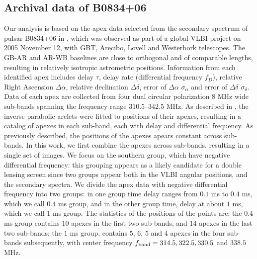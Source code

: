 \documentclass[useAMS,usenatbib]{mn2e}
\begin{document}
\subsection{Archival data of B0834+06}
\label{21}
Our analysis is based on the apex data selected from the secondary
spectrum of pulsar B0834+06 in \citep{2010ApJ...708..232B}, which was
observed as part of a global VLBI project on 2005 November 12, with
GBT, Arecibo, Lovell and Westerbork telescopes.  The GB-AR and AR-WB
baselines are close to orthogonal and of comparable lengths, resulting
in relatively isotropic astrometric positions.
Information from each identified apex includes delay $\tau$,
delay rate (differential frequency $f_D$), relative Right Ascension $\Delta\alpha$, relative declination $\Delta\delta$, error of $\Delta\alpha$ $\sigma_{\alpha}$ and error of $\Delta\delta$ $\sigma_{\delta}$. Data of each apex are collected from four dual circular polarization $8$ MHz wide sub-bands spanning the frequency range $310.5$--$342.5$ MHz. 
As described in \citet{2010ApJ...708..232B}, the inverse parabolic
arclets were fitted to positions of their apexes, resulting in a
catalog of apexes in each sub-band, each with delay and differential
frequency.  As previously described, the positions of the apexes
apears constant across sub-bands.  In this work, we first combine the
apexes across sub-bands, resulting in a single set of images.  We focus on
the southern group, which have negative differential frequency: this
grouping appears as a likely candidate for a double lensing screen
since two groups appear both in the VLBI angular positions, and the
secondary spectra.
We divide the apex data with negative differential frequency into two
groups: in one group time delay ranges from $0.1$ ms to $0.4$ ms,
which we call $0.4$ ms group, and in the other group time, delay at
about $1$ ms, which we call $1$ ms group. The statistics of the
positions of the points are: the $0.4$ ms group contains $10$ apexes in the first two sub-bands, and $14$ apexes in the last two sub-bands; the $1$ ms group, contains $5$, $6$, $5$ and $4$ apexes in the four sub-bands subsequently, with center frequency $f_{\rm band}=314.5, 322.5, 330.5$ and $ 338.5$ MHz. 
\end{document}

